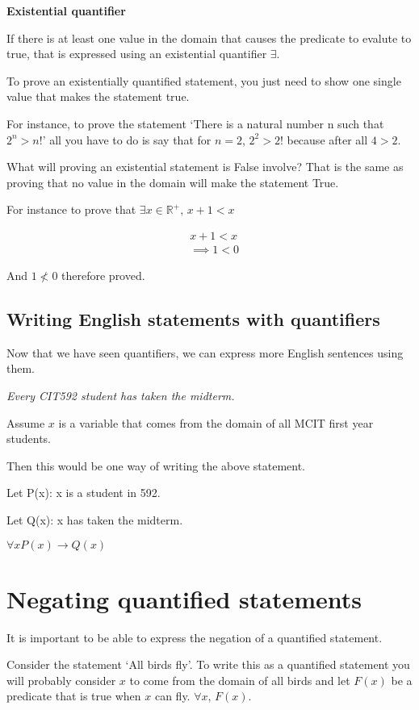 \documentclass[12pt]{article}
\begin{document}
\textbf{Existential quantifier}

If there is at least one value in the domain that causes the predicate to evalute to true, that is expressed using an existential quantifier $\exists$.

To prove an existentially quantified statement, you just need to show one single value that makes the statement true.

For instance, to prove the statement `There is a natural number n such that $2^n > n!$' all you have to do is say that for $n=2$, $2^2 > 2!$ because after all $4 > 2$.

What will proving an existential statement is False involve? That is the same as proving that no value in the domain will make the statement True.

For instance to prove that $\exists x \in \mathbb{R^+}, \, x + 1 < x$

\begin{align*}
& x + 1 < x 
\\ & \implies 1 < 0 \tag{ by subtracting x from both sides}
\end{align*}

And $1 \not < 0$ therefore proved.

\subsection*{Writing English statements with quantifiers}

Now that we have seen quantifiers, we can express more English sentences using them.

\medskip

\emph{Every CIT592 student has taken the midterm.}

Assume $x$ is a variable that comes from the domain of all MCIT first year students.

Then this would be one way of writing the above statement.

Let P(x): x is a student in 592.

Let Q(x): x has taken the midterm.

$\forall x P(x) \rightarrow Q(x)$ 

\section*{Negating quantified statements}
It is important to be able to express the negation of a quantified statement.

Consider the statement `All birds fly'. To write this as a quantified statement you will probably consider $x$ to come from the domain of all birds and let $F(x)$ be a predicate that is true when $x$ can fly. $\forall x, \, F(x)$. 
\end{document}
